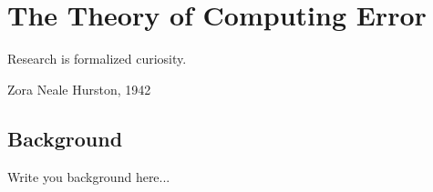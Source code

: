 

%

\chapter{The Theory of Computing Error}
\label{chap:Introduction}



\setlength{\epigraphwidth}{.35\textwidth}
\epigraph{Research is formalized curiosity.}{ Zora Neale Hurston, 1942}


\section{Background}
\label{background}

Write you background here...

